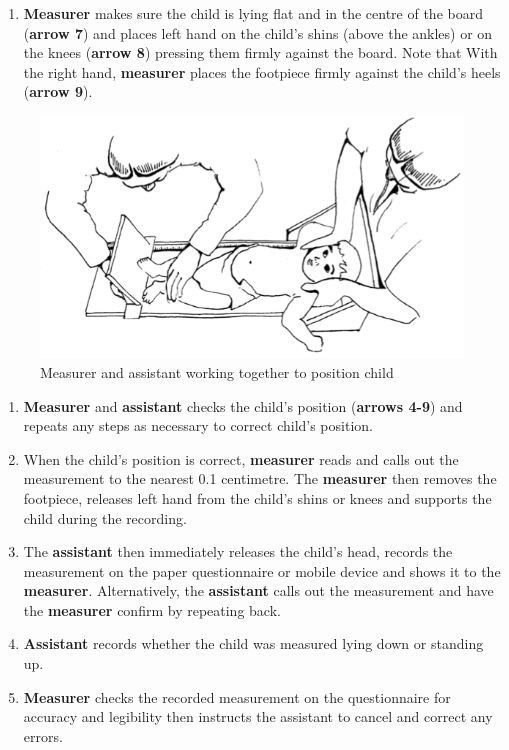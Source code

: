 \documentclass[
  12pt,
]{book}
\providecommand{\tightlist}{%
  \setlength{\itemsep}{0pt}\setlength{\parskip}{0pt}}
\begin{document}
\begin{enumerate}
\def\labelenumi{\arabic{enumi}.}
\setcounter{enumi}{6}
\tightlist
\item
  \textbf{Measurer} makes sure the child is lying flat and in the centre of the board (\textbf{arrow 7}) and places left hand on the child's shins (above the ankles) or on the knees (\textbf{arrow 8}) pressing them firmly against the board. Note that With the right hand, \textbf{measurer} places the footpiece firmly against the child's heels (\textbf{arrow 9}).
\end{enumerate}

\begin{figure}

{\centering \includegraphics[width=8.04in]{images/heightBoard06} 

}

\caption{Measurer and assistant working together to position child}\label{fig:height09}
\end{figure}

\begin{enumerate}
\def\labelenumi{\arabic{enumi}.}
\setcounter{enumi}{7}
\item
  \textbf{Measurer} and \textbf{assistant} checks the child's position (\textbf{arrows 4-9}) and repeats any steps as necessary to correct child's position.
\item
  When the child's position is correct, \textbf{measurer} reads and calls out the measurement to the nearest 0.1 centimetre. The \textbf{measurer} then removes the footpiece, releases left hand from the child's shins or knees and supports the child during the recording.
\item
  The \textbf{assistant} then immediately releases the child's head, records the measurement on the paper questionnaire or mobile device and shows it to the \textbf{measurer}. Alternatively, the \textbf{assistant} calls out the measurement and have the \textbf{measurer} confirm by repeating back.
\item
  \textbf{Assistant} records whether the child was measured lying down or standing up.
\item
  \textbf{Measurer} checks the recorded measurement on the questionnaire for accuracy and legibility then instructs the assistant to cancel and correct any errors.
\end{enumerate}
\end{document}
